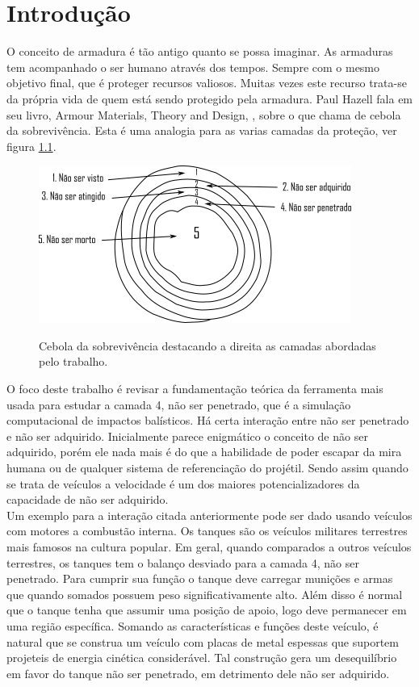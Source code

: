 \chapter{Introdução}

 O conceito de armadura é tão antigo quanto se possa imaginar. As armaduras tem acompanhado o ser humano através dos tempos. Sempre com o mesmo objetivo final, que é proteger recursos valiosos. Muitas vezes este recurso trata-se da própria vida de quem está sendo protegido pela armadura. Paul Hazell fala em seu livro, Armour Materials, Theory and Design, \cite{Hazell}, sobre o que chama de cebola da sobrevivência. Esta é uma analogia para as varias camadas da proteção, ver figura \ref{fig:0.1}.\\
 
 \begin{figure}[h]
 	\caption{Cebola da sobrevivência destacando a direita as camadas abordadas pelo trabalho.}
 	\centering
 	\includegraphics{images/cebola_sobrevive}
 	\label{fig:0.1}
 \end{figure}
O foco deste trabalho é revisar a fundamentação teórica da ferramenta mais usada para estudar a camada 4, não ser penetrado, que é a simulação computacional de impactos balísticos. Há certa interação entre não ser penetrado e não ser adquirido. Inicialmente parece enigmático o conceito de não ser adquirido, porém ele nada mais é do que a habilidade de poder escapar da mira humana ou de qualquer sistema de referenciação do projétil. Sendo assim quando se trata de veículos a velocidade é um dos maiores potencializadores da capacidade de não ser adquirido. \\

Um exemplo para a interação citada anteriormente pode ser dado usando veículos com motores a combustão interna. Os tanques são os veículos militares terrestres mais famosos na cultura popular. Em geral, quando comparados a outros veículos terrestres, os tanques tem o balanço desviado para a camada 4, não ser penetrado. Para cumprir sua função o tanque deve carregar munições e armas que quando somados possuem peso significativamente alto. Além disso é normal que o tanque tenha que assumir uma posição de apoio, logo deve permanecer em uma região específica. Somando as características e funções deste veículo, é natural que se construa um veículo com placas de metal espessas que suportem projeteis de energia cinética considerável. Tal construção gera um desequilíbrio em favor do tanque não ser penetrado, em detrimento dele não ser adquirido.\\ 


